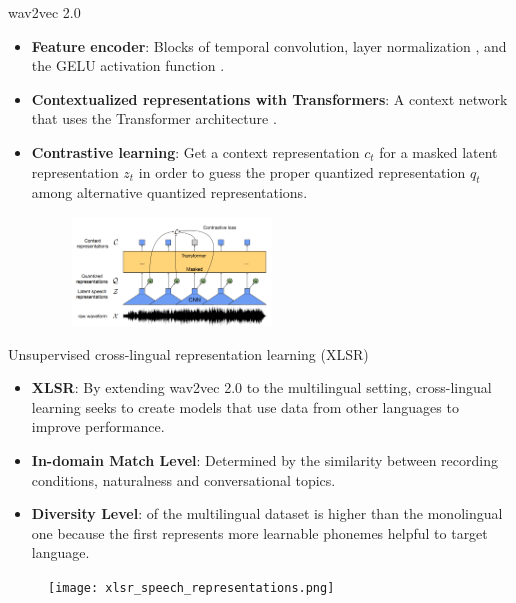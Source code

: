 \begin{frame}{wav2vec 2.0 \cite{facebookwav2vec2}}

\begin{itemize}
    \item \textbf{Feature encoder}: Blocks of temporal convolution, layer normalization \cite{layer_normalization}, and the GELU activation function \cite{gelu}. 

    \item \textbf{Contextualized representations with Transformers}: A context network that uses the Transformer architecture \cite{Transformer}. 
    
    \item \textbf{Contrastive learning}: Get a context representation $c_t$ for a masked latent representation $z_t$ in order to guess the proper quantized representation $q_t$ among alternative quantized representations.

    \begin{figure}[hbtp]
    \centering
    \includegraphics[width=0.5\textwidth]{figures/speech_representation_wav2vec2.PNG}
    \end{figure}
    
\end{itemize}

\end{frame}

\begin{frame}{Unsupervised cross-lingual representation learning (XLSR) \cite{XLSR}}

\begin{itemize}
    \item \textbf{XLSR}: By extending wav2vec 2.0 to the multilingual setting, cross-lingual learning seeks to create models that use data from other languages to improve performance. 
    
    \item \textbf{In-domain Match Level}:
     Determined by the similarity between recording conditions, naturalness and conversational topics.
    
    \item \textbf{Diversity Level}: of the multilingual dataset is higher than the monolingual one because the first represents more learnable phonemes helpful to target language.
\end{itemize}

\begin{figure}
    \centering
    \texttt{[image: xlsr\_speech\_representations.png]}
\end{figure}
        
\end{frame}
